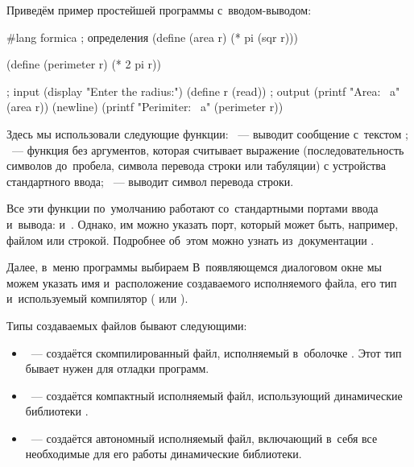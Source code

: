 Приведём пример простейшей программы с~вводом-выводом:
\begin{Definition}[emph={r}]
#lang formica
; определения
(define (area r)
   (* pi (sqr r)))

(define (perimeter r)
   (* 2 pi r))

; input
(display "Enter the radius:")
(define r (read))
; output
(printf "Area: ~a" (area r))
(newline)
(printf "Perimiter: ~a" (perimeter r))
\end{Definition}


Здесь мы использовали следующие функции: ~--- выводит сообщение с~текстом ; ~--- функция без аргументов, которая считывает выражение (последовательность символов до~пробела, символа перевода строки или табуляции) с устройства стандартного ввода; ~--- выводит символ перевода строки.

Все эти функции по~умолчанию работают со~стандартными портами ввода и~вывода:  и~. Однако, им можно указать порт, который может быть, например, файлом или строкой. Подробнее об~этом можно узнать из~документации .

Далее, в~меню программы  выбираем  В~появляющемся диалоговом окне мы можем указать имя и~расположение создаваемого исполняемого файла, его тип и~используемый компилятор ( или ).

Типы создаваемых файлов бывают следующими:

\begin{itemize}[--]
 \item {}~--- создаётся скомпилированный файл, исполняемый в~оболочке . Этот тип бывает нужен для отладки программ.

 \item {}~--- создаётся компактный исполняемый файл, использующий динамические библиотеки .

 \item {}~--- создаётся автономный исполняемый файл, включающий в~себя все необходимые для его работы динамические библиотеки.
\end{itemize}

